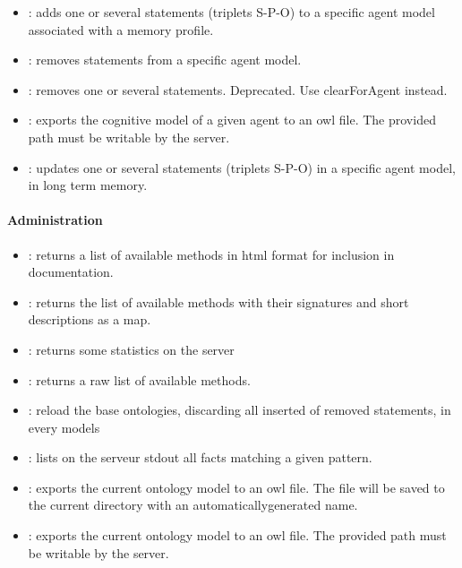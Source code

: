 \begin{itemize}
    \item {}: adds one or several
    statements (triplets S-P-O) to a specific agent model associated with a
    memory profile.

    \item {}: removes statements from a
    specific agent model.

    \item {}: removes one or several
    statements. Deprecated. Use clearForAgent instead.

    \item {}: exports the cognitive model of a
    given agent to an owl file. The provided path must be writable by the
    server.

    \item {}: updates one or several
    statements (triplets S-P-O) in a specific agent model, in long term memory.
\end{itemize}


\paragraph{Administration}
\begin{itemize}

    \item {}: returns a list of available methods in
    html format for inclusion in documentation.

    \item {}: returns the list of available methods with
    their signatures and short descriptions as a map.

    \item {}: returns some statistics on the server

    \item {}: returns a raw list of available
    methods.

    \item {}: reload the base ontologies, discarding all
    inserted of removed statements, in every models

    \item {}: lists on the serveur stdout all facts
    matching a given pattern.

    \item {}: exports the current ontology model to an owl
    file. The file will be saved to the current directory with an
    automaticallygenerated name.

    \item {}: exports the current ontology model to an
    owl file. The provided path must be writable by the server.
\end{itemize}

